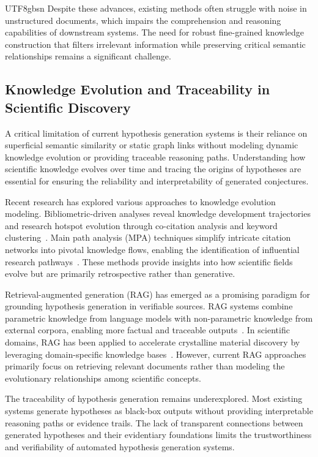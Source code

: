 \documentclass[11pt]{article}
\begin{document}
\begin{CJK}{UTF8}{gbsn}
Despite these advances, existing methods often struggle with noise in unstructured documents, which impairs the comprehension and reasoning capabilities of downstream systems. The need for robust fine-grained knowledge construction that filters irrelevant information while preserving critical semantic relationships remains a significant challenge.

\subsection{Knowledge Evolution and Traceability in Scientific Discovery}

A critical limitation of current hypothesis generation systems is their reliance on superficial semantic similarity or static graph links without modeling dynamic knowledge evolution or providing traceable reasoning paths. Understanding how scientific knowledge evolves over time and tracing the origins of hypotheses are essential for ensuring the reliability and interpretability of generated conjectures.

Recent research has explored various approaches to knowledge evolution modeling. Bibliometric-driven analyses reveal knowledge development trajectories and research hotspot evolution through co-citation analysis and keyword clustering~\cite{zhang2025bibliometric,hosseini2025topical}. Main path analysis (MPA) techniques simplify intricate citation networks into pivotal knowledge flows, enabling the identification of influential research pathways~\cite{rejeb2025knowledge}. These methods provide insights into how scientific fields evolve but are primarily retrospective rather than generative.

Retrieval-augmented generation (RAG) has emerged as a promising paradigm for grounding hypothesis generation in verifiable sources. RAG systems combine parametric knowledge from language models with non-parametric knowledge from external corpora, enabling more factual and traceable outputs~\cite{amugongo2025retrieval,liu2025retrieval}. In scientific domains, RAG has been applied to accelerate crystalline material discovery by leveraging domain-specific knowledge bases~\cite{oche2025role}. However, current RAG approaches primarily focus on retrieving relevant documents rather than modeling the evolutionary relationships among scientific concepts.

The traceability of hypothesis generation remains underexplored. Most existing systems generate hypotheses as black-box outputs without providing interpretable reasoning paths or evidence trails. The lack of transparent connections between generated hypotheses and their evidentiary foundations limits the trustworthiness and verifiability of automated hypothesis generation systems.


\end{CJK}
\end{document}
